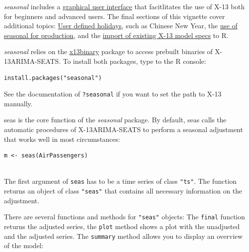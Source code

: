 \emph{seasonal} includes a \hyperref[graphical-user-interface]{graphical
user interface} that facitlitates the use of X-13 both for beginners and
advanced users. The final sections of this vignette cover additional
topics:
\hyperref[chinese-new-year-indian-diwali-and-other-customized-holidays]{User
defined holidays}, such as Chinese New Year, the
\hyperref[production-use]{use of seasonal for production}, and the
\hyperref[import-x-13-models-and-series]{import of existing X-13 model
specs} to R.


\emph{seasonal} relies on the
\href{https://cran.r-project.org/package=x13binary}{x13binary} package
to access prebuilt binaries of X-13ARIMA-SEATS. To install both
packages, type to the R console:

\begin{verbatim}
install.packages("seasonal")
\end{verbatim}

See the documentation of \texttt{?seasonal} if you want to set the path
to X-13 manually.


seas is the core function of the \emph{seasonal} package. By default,
seas calls the automatic procedures of X-13ARIMA-SEATS to perform a
seasonal adjustment that works well in most circumstances:

\begin{verbatim}
m <- seas(AirPassengers)
 
\end{verbatim}

The first argument of \texttt{seas} has to be a time series of class
\texttt{"ts"}. The function returns an object of class \texttt{"seas"}
that contains all necessary information on the adjustment.

There are several functions and methods for \texttt{"seas"} objects: The
\texttt{final} function returns the adjusted series, the \texttt{plot}
method shows a plot with the unadjusted and the adjusted series. The
\texttt{summary} method allows you to display an overview of the model:


